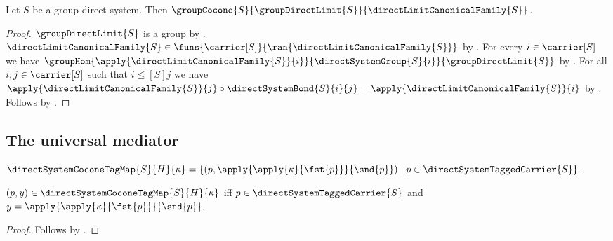 \begin{theorem}\label{group_direct_limit_canonical_cocone}
    Let $S$ be a group direct system.
    Then $\groupCocone
        {S}{\groupDirectLimit{S}}{\directLimitCanonicalFamily{S}}$.
\end{theorem}
\begin{proof}
    $\groupDirectLimit{S}$ is a group by
        .
    $\directLimitCanonicalFamily{S}\in
        \funs{\carrier[S]}{\ran{\directLimitCanonicalFamily{S}}}$ by
        .
    For every $i\in\carrier[S]$ we have
        $\groupHom
            {\apply{\directLimitCanonicalFamily{S}}{i}}
            {\directSystemGroup{S}{i}}
            {\groupDirectLimit{S}}$ by
        .
    For all $i,j\in\carrier[S]$ such that
        $i\mathrel{\leq[S]}j$ we have
        $\apply{\directLimitCanonicalFamily{S}}{j}\circ
            \directSystemBond{S}{i}{j}
        =\apply{\directLimitCanonicalFamily{S}}{i}$ by
        .
    Follows by .
\end{proof}

\subsection{The universal mediator}

\begin{definition}\label{direct_system_cocone_tag_map}
    $\directSystemCoconeTagMap{S}{H}{\kappa}=
        \{(p,\apply{\apply{\kappa}{\fst{p}}}{\snd{p}})
            \mid p\in\directSystemTaggedCarrier{S}\}$.
\end{definition}

\begin{proposition}\label{direct_system_cocone_tag_map_iff}
    $(p,y)\in\directSystemCoconeTagMap{S}{H}{\kappa}$ iff
        $p\in\directSystemTaggedCarrier{S}$ and
        $y=\apply{\apply{\kappa}{\fst{p}}}{\snd{p}}$.
\end{proposition}
\begin{proof}
    Follows by
        .
\end{proof}


